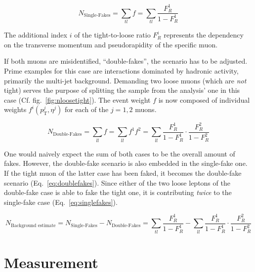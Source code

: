 \begin{equation}
  \label{eq:singlefakes}
  N_{\text{Single-Fakes}} = \sum_{tl} f = \sum_{tl} \frac{F_R^1}{1 - F_R^1}
\end{equation}

\noindent The additional index $i$ of the tight-to-loose ratio $F_R^i$ represents the dependency on the transverse momentum and pseudorapidity of the specific muon. 

If both muons are misidentified, ``double-fakes'', the scenario has to be adjusted. Prime examples for this case are interactions dominated by hadronic activity, primarily the multi-jet background. Demanding two loose muons (which are \textit{not} tight) serves the purpose of splitting the sample from the analysis' one in this case (Cf. fig.~\ref{fig:nloosetight}). The event weight $f$ is now composed of individual weights $f^i (p_{\text{T}}^j, \eta^j)$ for each of the $j = 1, 2$ muons.

\begin{equation}
  \label{eq:doublefakes}
  N_{\text{Double-Fakes}} = \sum_{ll} f = \sum_{ll} f^1 f^2 = \sum_{ll} \frac{F_R^1}{1 - F_R^1} \cdot \frac{F_R^2}{1 - F_R^2}
\end{equation}

One would naively expect the sum of both cases to be the overall amount of fakes. However, the double-fake scenario is also embedded in the single-fake one. If the tight muon of the latter case has been faked, it becomes the double-fake scenario (Eq.~\ref{eq:doublefakes}). Since either of the two loose leptons of the double-fake case is able to fake the tight one, it is contributing \textit{twice} to the single-fake case (Eq.~\ref{eq:singlefakes}).

\begin{equation}
  \label{eq:fakes}
  N_{\text{Background estimate}} = N_{\text{Single-Fakes}} - N_{\text{Double-Fakes}} =  \sum_{tl} \frac{F_R^1}{1 - F_R^1} - \sum_{ll} \frac{F_R^1}{1 - F_R^1} \cdot \frac{F_R^2}{1 - F_R^2}
\end{equation}


\section{Measurement}
\label{sec:tlmeasurement}

